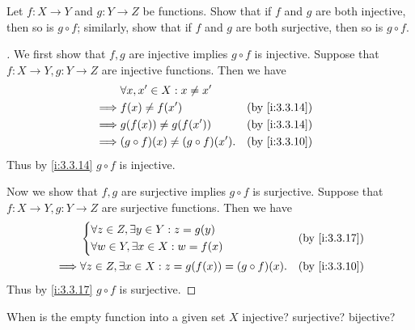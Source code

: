 \begin{ex}\label{i:ex:3.3.2}
  Let \(f : X \to Y\) and \(g : Y \to Z\) be functions.
  Show that if \(f\) and \(g\) are both injective, then so is \(g \circ f\);
  similarly, show that if \(f\) and \(g\) are both surjective, then so is \(g \circ f\).
\end{ex}

\begin{proof}[]
  We first show that \(f, g\) are injective implies \(g \circ f\) is injective.
  Suppose that \(f : X \to Y, g : Y \to Z\) are injective functions.
  Then we have
  \begin{align*}
             & \forall x, x' \in X : x \neq x'                         \\
    \implies & f(x) \neq f(x')                      &  & \by{i:3.3.14} \\
    \implies & g(f(x)) \neq g(f(x'))                &  & \by{i:3.3.14} \\
    \implies & (g \circ f)(x) \neq (g \circ f)(x'). &  & \by{i:3.3.10}
  \end{align*}
  Thus by \cref{i:3.3.14} \(g \circ f\) is injective.

  Now we show that \(f, g\) are surjective implies \(g \circ f\) is surjective.
  Suppose that \(f : X \to Y, g : Y \to Z\) are surjective functions.
  Then we have
  \begin{align*}
             & \begin{dcases}
                 \forall z \in Z, \exists y \in Y : z = g(y) \\
                 \forall w \in Y, \exists x \in X : w = f(x)
               \end{dcases}                   &  & \by{i:3.3.17}                                   \\
    \implies & \forall z \in Z, \exists x \in X : z = g(f(x)) = (g \circ f)(x). &  & \by{i:3.3.10}
  \end{align*}
  Thus by \cref{i:3.3.17} \(g \circ f\) is surjective.
\end{proof}

\begin{ex}\label{i:ex:3.3.3}
  When is the empty function into a given set \(X\) injective?
  surjective?
  bijective?
\end{ex}

